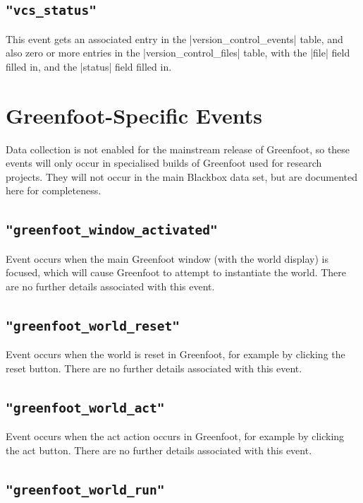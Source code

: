 \documentclass{report}
\begin{document}
\subsection{\lstinline!"vcs_status"!}

This event gets an associated entry in the |version_control_events|
table, and also zero or more entries in the |version_control_files|
table, with the |file| field filled in, and the |status| field filled
in.

\section{Greenfoot-Specific Events}

Data collection is not enabled for the mainstream release of Greenfoot,
so these events will only occur in specialised builds of Greenfoot
used for research projects.  They will not occur in the main Blackbox
data set, but are documented here for completeness.

\subsection{\lstinline!"greenfoot_window_activated"!}

Event occurs when the main Greenfoot window (with the world display) is
focused, which will cause Greenfoot to attempt to instantiate the world.
There are no further details associated with this event.

\subsection{\lstinline!"greenfoot_world_reset"!}

Event occurs when the world is reset in Greenfoot, for example
by clicking the reset button.
There are no further details associated with this event.

\subsection{\lstinline!"greenfoot_world_act"!}

Event occurs when the act action occurs in Greenfoot, for example
by clicking the act button.
There are no further details associated with this event.

\subsection{\lstinline!"greenfoot_world_run"!}
\end{document}
